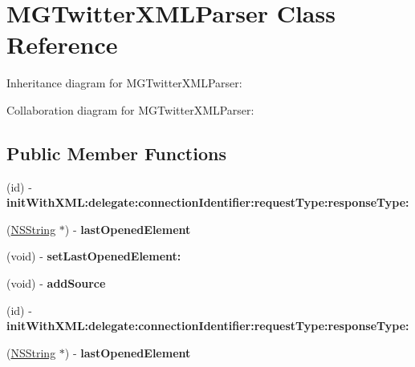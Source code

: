\hypertarget{interface_m_g_twitter_x_m_l_parser}{
\section{\-M\-G\-Twitter\-X\-M\-L\-Parser \-Class \-Reference}
\label{interface_m_g_twitter_x_m_l_parser}
}


\-Inheritance diagram for \-M\-G\-Twitter\-X\-M\-L\-Parser\-:


\-Collaboration diagram for \-M\-G\-Twitter\-X\-M\-L\-Parser\-:
\subsection*{\-Public \-Member \-Functions}
\begin{DoxyCompactItemize}
\item 
\hypertarget{interface_m_g_twitter_x_m_l_parser_a0ac17bed31a74f0234704fbf8a514f16}{
(id) -\/ {\bfseries init\-With\-X\-M\-L\-:delegate\-:connection\-Identifier\-:request\-Type\-:response\-Type\-:}}
\label{interface_m_g_twitter_x_m_l_parser_a0ac17bed31a74f0234704fbf8a514f16}

\item 
\hypertarget{interface_m_g_twitter_x_m_l_parser_a3b952453133dc9fbad477ee8c0d3a57f}{
(\hyperlink{class_n_s_string}{\-N\-S\-String} $\ast$) -\/ {\bfseries last\-Opened\-Element}}
\label{interface_m_g_twitter_x_m_l_parser_a3b952453133dc9fbad477ee8c0d3a57f}

\item 
\hypertarget{interface_m_g_twitter_x_m_l_parser_aa2e7eb457f995c9462f125c33dbbd29b}{
(void) -\/ {\bfseries set\-Last\-Opened\-Element\-:}}
\label{interface_m_g_twitter_x_m_l_parser_aa2e7eb457f995c9462f125c33dbbd29b}

\item 
\hypertarget{interface_m_g_twitter_x_m_l_parser_a984290a5b4b08733da8e0892e9ea7d06}{
(void) -\/ {\bfseries add\-Source}}
\label{interface_m_g_twitter_x_m_l_parser_a984290a5b4b08733da8e0892e9ea7d06}

\item 
\hypertarget{interface_m_g_twitter_x_m_l_parser_a0ac17bed31a74f0234704fbf8a514f16}{
(id) -\/ {\bfseries init\-With\-X\-M\-L\-:delegate\-:connection\-Identifier\-:request\-Type\-:response\-Type\-:}}
\label{interface_m_g_twitter_x_m_l_parser_a0ac17bed31a74f0234704fbf8a514f16}

\item 
\hypertarget{interface_m_g_twitter_x_m_l_parser_a3b952453133dc9fbad477ee8c0d3a57f}{
(\hyperlink{class_n_s_string}{\-N\-S\-String} $\ast$) -\/ {\bfseries last\-Opened\-Element}}
\label{interface_m_g_twitter_x_m_l_parser_a3b952453133dc9fbad477ee8c0d3a57f}


\end{DoxyCompactItemize}
